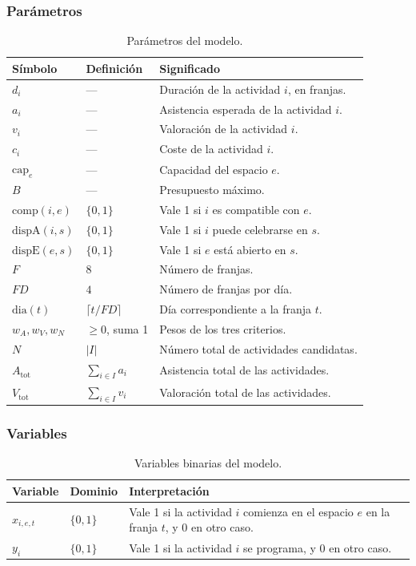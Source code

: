 \subsubsection{Parámetros}
\begin{table}[H]
\centering
\begin{tabular}{p{}p{}p{}}
\toprule
\textbf{Símbolo} & \textbf{Definición} & \textbf{Significado} \\
\midrule
$d_i$ & --- & Duración de la actividad $i$, en franjas. \\
$a_i$ & --- & Asistencia esperada de la actividad $i$. \\
$v_i$ & --- & Valoración de la actividad $i$. \\
$c_i$ & --- & Coste de la actividad $i$. \\
$\mathrm{cap}_e$ & --- & Capacidad del espacio $e$. \\
$B$ & --- & Presupuesto máximo. \\
$\mathrm{comp}(i,e)$ & $\{0,1\}$ & Vale 1 si $i$ es compatible con $e$. \\
$\mathrm{dispA}(i,s)$ & $\{0,1\}$ & Vale 1 si $i$ puede celebrarse en $s$. \\
$\mathrm{dispE}(e,s)$ & $\{0,1\}$ & Vale 1 si $e$ está abierto en $s$. \\
$F$ & $8$ & Número de franjas. \\
$FD$ & $4$ & Número de franjas por día. \\
$\mathrm{dia}(t)$ & $\lceil t/FD\rceil$ & Día correspondiente a la franja $t$. \\
$w_A,w_V,w_N$ & $\geq 0$, suma 1 & Pesos de los tres criterios. \\
$N$ & $|I|$ & Número total de actividades candidatas. \\
$A_{\mathrm{tot}}$ & $\sum_{i\in I}a_i$ & Asistencia total de las actividades. \\
$V_{\mathrm{tot}}$ & $\sum_{i\in I}v_i$ & Valoración total de las actividades. \\
\bottomrule
\end{tabular}
\caption{Parámetros del modelo.}
\end{table}

\subsubsection{Variables}
\begin{table}[H]
\centering
\begin{tabular}{p{}p{}p{}}
\toprule
\textbf{Variable} & \textbf{Dominio} & \textbf{Interpretación} \\
\midrule
$x_{i,e,t}$ & $\{0,1\}$ & Vale 1 si la actividad $i$ comienza en el espacio
$e$ en la franja $t$, y 0 en otro caso. \\
$y_i$ & $\{0,1\}$ & Vale 1 si la actividad $i$ se programa, y 0 en otro caso. \\
\bottomrule
\end{tabular}
\caption{Variables binarias del modelo.}
\end{table}

